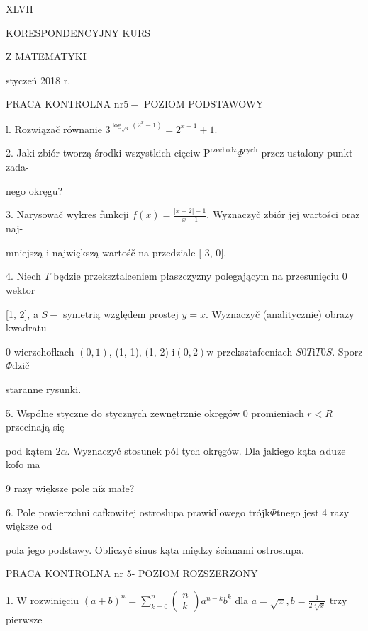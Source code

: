 \documentclass[a4paper,12pt]{article}
\begin{document}
XLVII

KORESPONDENCYJNY KURS

Z MATEMATYKI

styczeń 2018 r.

PRACA KONTROLNA $\mathrm{n}\mathrm{r} 5-$ POZIOM PODSTAWOWY

l. Rozwiązač równanie $3^{\log_{\sqrt{3}}(2^{x}-1)}=2^{x+1}+1.$

2. Jaki zbiór tworzą środki wszystkich cięciw $\mathrm{P}^{\mathrm{r}\mathrm{z}\mathrm{e}\mathrm{c}\mathrm{h}\mathrm{o}\mathrm{d}\mathrm{z}}\Phi^{\mathrm{c}\mathrm{y}\mathrm{c}\mathrm{h}}$ przez ustalony punkt zada-

nego okręgu?

3. Narysowač wykres funkcji $f(x) = \displaystyle \frac{|x+2|-1}{x-1}$. Wyznaczyč zbiór jej wartości oraz naj-

mniejszą $\mathrm{i}$ największą wartośč na przedziale $[$-3, $0].$

4. Niech $T$ będzie przeksztalceniem płaszczyzny polegającym na przesunięciu $0$ wektor

[1, 2], a $S-$ symetrią względem prostej $y=x$. Wyznaczyč (analitycznie) obrazy kwadratu

$0$ wierzchofkach $(0,1)$, (1, 1), (1, 2) $\mathrm{i}(0,2)\mathrm{w}$ przeksztafceniach $S0T\mathrm{i}T0S$. Sporz$\Phi$dzič

staranne rysunki.

5. Wspólne styczne do stycznych zewnętrznie okręgów $0$ promieniach $r<R$ przecinają się

pod kątem $ 2\alpha$. Wyznaczyč stosunek pól tych okręgów. Dla jakiego kąta $\alpha \mathrm{d}\mathrm{u}\dot{\mathrm{z}}\mathrm{e}$ kofo ma

9 razy większe pole $\mathrm{n}\mathrm{i}\dot{\mathrm{z}}$ małe?

6. Pole powierzchni cafkowitej ostroslupa prawidlowego trójk$\Phi$tnego jest 4 razy większe od

pola jego podstawy. Obliczyč sinus kąta między ścianami ostroslupa.




PRACA KONTROLNA nr 5- POZIOM ROZSZERZONY

1. $\mathrm{W}$ rozwinięciu $(a+b)^{n} = \displaystyle \sum_{k=0}^{n}\left(\begin{array}{l}
n\\
k
\end{array}\right)a^{n-k}b^{k}$ dla $a = \sqrt{x}, b = \displaystyle \frac{1}{2\sqrt[4]{x}}$ trzy pierwsze
\end{document}
